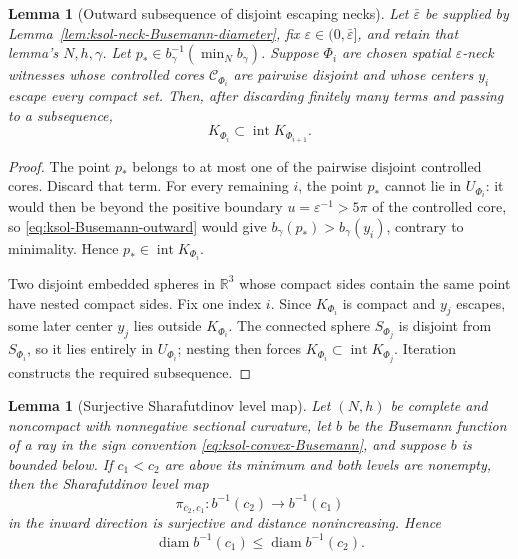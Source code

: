 \documentclass[10pt]{coll-l}
\newcommand{\R}{\mathbb{R}}
\newtheorem{lemma}[theorem]{Lemma}
\theoremstyle{definition}
\theoremstyle{remark}
\numberwithin{section}{chapter}
\numberwithin{equation}{chapter}
\begin{document}
\begin{lemma}[Outward subsequence of disjoint escaping necks]
\label{lem:ksol-neck-outward-subsequence}
Let $\bar\varepsilon$ be supplied by
Lemma~\ref{lem:ksol-neck-Busemann-diameter}, fix
$\varepsilon\in(0,\bar\varepsilon]$, and retain that lemma's $N,h,\gamma$.
Let
$p_*\in b_\gamma^{-1}(\min_N b_\gamma)$.  Suppose $\Phi_i$ are chosen
spatial $\varepsilon$-neck witnesses whose controlled cores
$\mathcal C_{\Phi_i}$ are pairwise disjoint and whose centers $y_i$ escape
every compact set.  Then, after discarding finitely many terms and passing
to a subsequence,
\begin{equation}
                    K_{\Phi_i}\subset
                    \operatorname{int}K_{\Phi_{i+1}}.          \label{eq:ksol-neck-nested-subsequence}
\end{equation}
\end{lemma}

\begin{proof}
The point $p_*$ belongs to at most one of the pairwise disjoint controlled
cores.  Discard that term.  For every remaining $i$, the point $p_*$
cannot lie in $U_{\Phi_i}$: it would then be beyond the positive boundary
$u=\varepsilon^{-1}>5\pi$ of the controlled core, so
\eqref{eq:ksol-Busemann-outward} would give
$b_\gamma(p_*)>b_\gamma(y_i)$, contrary to minimality.  Hence
$p_*\in\operatorname{int}K_{\Phi_i}$.

Two disjoint embedded spheres in $\R^3$ whose compact sides contain the
same point have nested compact sides.  Fix one index $i$.  Since
$K_{\Phi_i}$ is compact and $y_j$ escapes, some later center $y_j$ lies
outside $K_{\Phi_i}$.  The connected sphere $S_{\Phi_j}$ is disjoint from
$S_{\Phi_i}$, so it lies entirely in $U_{\Phi_i}$; nesting then forces
$K_{\Phi_i}\subset\operatorname{int}K_{\Phi_j}$.  Iteration constructs
the required subsequence.
\end{proof}

\begin{lemma}[Surjective Sharafutdinov level map]
\label{lem:ksol-Sharafutdinov-level-surjective}
Let $(N,h)$ be complete and noncompact with nonnegative sectional curvature,
let $b$ be the Busemann function of a ray in the sign convention
\eqref{eq:ksol-convex-Busemann}, and suppose $b$ is bounded below.  If
$c_1<c_2$ are above its minimum and both levels are nonempty, then the
Sharafutdinov level map
\begin{equation}
             \pi_{c_2,c_1}:b^{-1}(c_2)\longrightarrow b^{-1}(c_1)
                                                               \label{eq:ksol-Sharafutdinov-level-map}
\end{equation}
in the inward direction is surjective and distance nonincreasing.  Hence
\begin{equation}
              \operatorname{diam}b^{-1}(c_1)
                    \leq\operatorname{diam}b^{-1}(c_2).        \label{eq:ksol-Busemann-level-diameter-monotone}
\end{equation}
\end{lemma}
\end{document}
